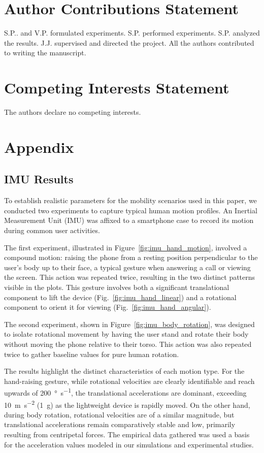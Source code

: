 \documentclass[fleqn,10pt]{wlscirep}
\begin{document}
\section*{Author Contributions Statement}
S.P.. and V.P. formulated experiments. S.P. performed experiments. S.P. analyzed the results. J.J. supervised and directed the project. All the authors contributed to writing the manuscript.


\section*{Competing Interests Statement}
The authors declare no competing interests.

\newpage
\section*{Appendix}
\subsection*{IMU Results}
To establish realistic parameters for the mobility scenarios used in this paper, we conducted two experiments to capture typical human motion profiles. An Inertial Measurement Unit (IMU) was affixed to a smartphone case to record its motion during common user activities.

The first experiment, illustrated in Figure~\ref{fig:imu_hand_motion}, involved a compound motion: raising the phone from a resting position perpendicular to the user's body up to their face, a typical gesture when answering a call or viewing the screen. This action was repeated twice, resulting in the two distinct patterns visible in the plots. This gesture involves both a significant translational component to lift the device (Fig.~\ref{fig:imu_hand_linear}) and a rotational component to orient it for viewing (Fig.~\ref{fig:imu_hand_angular}).

The second experiment, shown in Figure~\ref{fig:imu_body_rotation}, was designed to isolate rotational movement by having the user stand and rotate their body without moving the phone relative to their torso. This action was also repeated twice to gather baseline values for pure human rotation.

The results highlight the distinct characteristics of each motion type. For the hand-raising gesture, while rotational velocities are clearly identifiable and reach upwards of \SI{200}{\degree\per\second}, the translational accelerations are dominant, exceeding \SI{10}{\meter\per\second\squared} (\SI{1}{g}) as the lightweight device is rapidly moved. On the other hand, during body rotation, rotational velocities are of a similar magnitude, but translational accelerations remain comparatively stable and low, primarily resulting from centripetal forces. The empirical data gathered was used a basis for the acceleration values modeled in our simulations and experimental studies.
\end{document}

